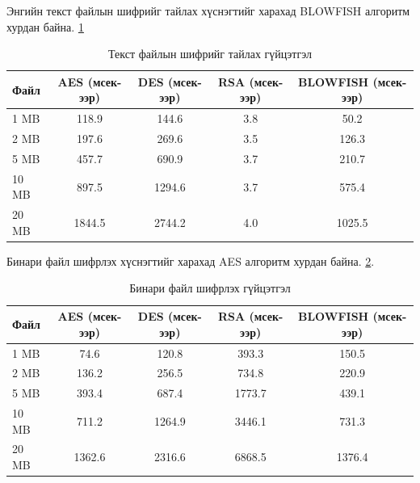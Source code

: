 Энгийн текст файлын шифрийг тайлах хүснэгтийг харахад BLOWFISH алгоритм хурдан байна. \ref{tab:decrypt_performance_text}
\begin{table}[H]
  \centering
  \footnotesize
  \begin{tabular}{|l|c|c|c|c|}
    \hline
    \textbf{Файл} & \textbf{AES (мсек-ээр)} & \textbf{DES (мсек-ээр)} & \textbf{RSA (мсек-ээр)} & \textbf{BLOWFISH (мсек-ээр)} \\
    \hline
    1 MB & 118.9 & 144.6 & 3.8 & 50.2 \\
    \hline
    2 MB & 197.6 & 269.6 & 3.5 & 126.3 \\
    \hline
    5 MB & 457.7 & 690.9 & 3.7 & 210.7 \\
    \hline
    10 MB & 897.5 & 1294.6 & 3.7 & 575.4 \\
    \hline
    20 MB & 1844.5 & 2744.2 & 4.0 & 1025.5 \\
    \hline
  \end{tabular}
  \caption{Текст файлын шифрийг тайлах гүйцэтгэл}
  \label{tab:decrypt_performance_text}
\end{table}

Бинари файл шифрлэх хүснэгтийг харахад AES алгоритм хурдан байна. \ref{tab:encrypt_performance_binary}.
\begin{table}[H]
  \centering
  \footnotesize
  \begin{tabular}{|l|c|c|c|c|}
    \hline
    \textbf{Файл} & \textbf{AES (мсек-ээр)} & \textbf{DES (мсек-ээр)} & \textbf{RSA (мсек-ээр)} & \textbf{BLOWFISH (мсек-ээр)} \\
    \hline
    1 MB & 74.6 & 120.8 & 393.3 & 150.5 \\
    \hline
    2 MB & 136.2 & 256.5 & 734.8 & 220.9 \\
    \hline
    5 MB & 393.4 & 687.4 & 1773.7 & 439.1 \\
    \hline
    10 MB & 711.2 & 1264.9 & 3446.1 & 731.3 \\
    \hline
    20 MB & 1362.6 & 2316.6 & 6868.5 & 1376.4 \\
    \hline
  \end{tabular}
  \caption{Бинари файл шифрлэх гүйцэтгэл}
  \label{tab:encrypt_performance_binary}
\end{table}

